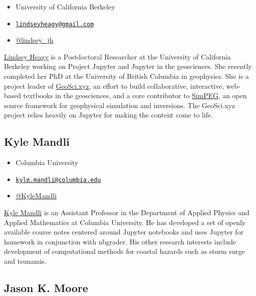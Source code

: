 \documentclass[]{book}
\providecommand{\tightlist}{%
  \setlength{\itemsep}{0pt}\setlength{\parskip}{0pt}}
\begin{document}
\begin{itemize}
\tightlist
\item
  University of California Berkeley
\item
  \href{mailto:lindseyheagy@gmail.com}{\nolinkurl{lindseyheagy@gmail.com}}
\item
  \href{https://twitter.com/lindsey_jh}{@lindsey\_jh}
\end{itemize}

\href{https://www.lindseyjh.ca/}{Lindsey Heagy} is a Postdoctoral
Researcher at the University of California Berkeley working on Project
Jupyter and Jupyter in the geosciences. She recently completed her PhD
at the University of British Columbia in geophysics. She is a project
leader of \href{http://geosci.xyz}{GeoSci.xyz}, an effort to build
collaborative, interactive, web-based textbooks in the geosciences, and
a core contributor to \href{https://www.simpeg.xyz/}{SimPEG}, an open
source framework for geophysical simulation and inversions. The
GeoSci.xyz project relies heavily on Jupyter for making the content come
to life.

\subsection*{Kyle Mandli}\label{kyle-mandli}

\begin{itemize}
\tightlist
\item
  Columbia University
\item
  \href{mailto:kyle.mandli@columbia.edu}{\nolinkurl{kyle.mandli@columbia.edu}}
\item
  \href{https://twitter.com/KyleMandli}{@KyleMandli}
\end{itemize}

\href{http://www.columbia.edu/~ktm2132/}{Kyle Mandli} is an Assistant
Professor in the Department of Applied Physics and Applied Mathematics
at Columbia University. He has developed a set of openly available
course notes centered around Jupyter notebooks and uses Jupyter for
homework in conjunction with nbgrader. His other research interests
include development of computational methods for coastal hazards such as
storm surge and tsunamis.

\subsection*{Jason K. Moore}\label{jason-k.-moore}
\end{document}
